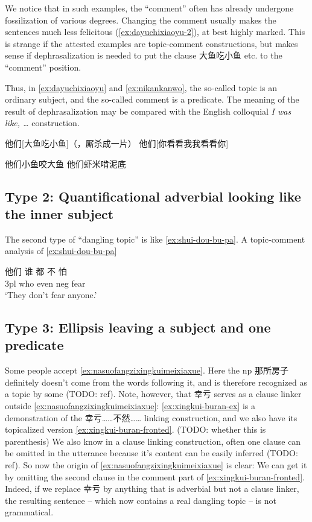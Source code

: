 \documentclass[UTF8, a4paper, oneside, scheme=plain, 12pt]{ctexrep}
\newcommand{\form}[1]{\emph{#1}}
\newcommand{\translate}[1]{`#1'}
\begin{document}
We notice that in such examples, 
the ``comment'' often has already undergone fossilization of various degrees.
Changing the comment usually makes the sentences much less felicitous 
(\ref{ex:dayuchixiaoyu-2}),
at best highly marked.
This is strange if the attested examples are topic-comment constructions,
but makes sense if dephrasalization is needed 
to put the clause 大鱼吃小鱼 etc. to the ``comment'' position.

Thus, in \eqref{ex:dayuchixiaoyu} and \eqref{ex:nikankanwo},
the so-called topic is an ordinary subject,
and the so-called comment is a predicate.
The meaning of the result of dephrasalization 
may be compared with the English colloquial 
\form{I was like, \dots} construction.

\begin{exe}
    \ex\label{ex:dayuchixiaoyu} 他们[大鱼吃小鱼]（，厮杀成一片）
    \ex\label{ex:nikankanwo} 他们[你看看我我看看你]
    
    \ex\label{ex:dayuchixiaoyu-2} \begin{xlist}
        \ex *他们小鱼咬大鱼 
        \ex *他们虾米啃泥底
    \end{xlist}
\end{exe}

\subsection{Type 2: Quantificational adverbial looking like the inner subject}

The second type of ``dangling topic'' is like \eqref{ex:shui-dou-bu-pa}.
A topic-comment analysis of \eqref{ex:shui-dou-bu-pa} 

\begin{exe}
    \ex\label{ex:shui-dou-bu-pa} \gll 他们 谁 都 不 怕 \\
    3pl who even \acs{neg} fear \\
    \glt \translate{They don't fear anyone.}
\end{exe}

\subsection{Type 3: Ellipsis leaving a subject and one predicate}

Some people accept \eqref{ex:nasuofangzixingkuimeixiaxue}.
Here the \acs{np} 那所房子 definitely doesn't come from the words following it,
and is therefore recognized as a topic by some (TODO: ref). 
Note, however, that 幸亏 serves as a clause linker outside \eqref{ex:nasuofangzixingkuimeixiaxue}:
\eqref{ex:xingkui-buran-ex} is a demonstration of the 幸亏……不然…… linking construction,
and we also have its topicalized version \eqref{ex:xingkui-buran-fronted}. (TODO: whether this is parenthesis)
We also know in a clause linking construction,
often one clause can be omitted in the utterance because it's content can be easily inferred (TODO: ref).
So now the origin of \eqref{ex:nasuofangzixingkuimeixiaxue} is clear:
We can get it by omitting the second clause in the comment part of \eqref{ex:xingkui-buran-fronted}.
Indeed, if we replace 幸亏 by anything that is adverbial but not a clause linker,
the resulting sentence -- which now contains a real dangling topic -- is not grammatical.
\end{document}
